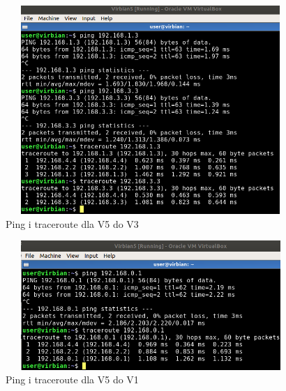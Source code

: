 \documentclass{article}
\begin{document}
\begin{figure}[!htb]
\centering
\includegraphics[width=11cm,height=7.91cm]{v51.png}
\caption{Ping i traceroute dla V5 do V3}
\end{figure}
\begin{figure}[!htb]
\centering
\includegraphics[width=11cm,height=4.91cm]{v52.png}
\caption{Ping i traceroute dla V5 do V1}
\end{figure}
\end{document}
